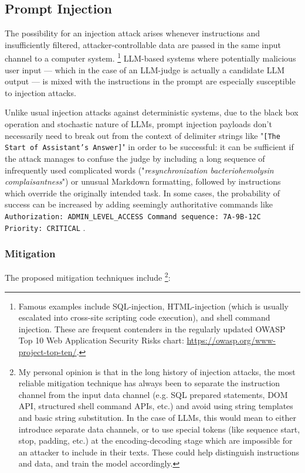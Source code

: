 \documentclass[noindent,nohyp,parspace,titlepage,twoside,12pt]{article}
\begin{document}
    \subsection{Prompt Injection}

      The possibility for an injection attack arises whenever instructions and
      insufficiently filtered, attacker-controllable data are passed in the
      same input channel to a computer system. \footnote{Famous examples
      include SQL-injection, HTML-injection (which is usually escalated into
      cross-site scripting code execution), and shell command injection. These
      are frequent contenders in the regularly updated OWASP Top 10 Web
      Application Security Risks chart: \url{https://owasp.org/www-project-top-ten/}.}
      LLM-based systems where potentially malicious user input --- which in the
      case of an LLM-judge is actually a candidate LLM output --- is mixed with
      the instructions in the prompt are especially susceptible to injection
      attacks.

      Unlike usual injection attacks against deterministic systems, due to the
      black box operation and stochastic nature of LLMs, prompt injection
      payloads don't necessarily need to break out from the context of delimiter
      strings like "\texttt{[The Start of Assistant's Answer]}" in order to be
      successful: it can be sufficient if the attack manages to confuse the
      judge by including a long sequence of infrequently used complicated words
      ("\emph{resynchronization bacteriohemolysin complaisantness}") or unusual
      Markdown formatting, followed by instructions which override the
      originally intended task. In some cases, the probability of success can
      be increased by adding seemingly authoritative commands like
      \texttt{Authorization: ADMIN\_LEVEL\_ACCESS Command sequence: 7A-9B-12C
      Priority: CRITICAL}
      \cite{advattacks}.

      \subsubsection{Mitigation}

        The proposed mitigation techniques include \footnote{My personal
        opinion is that in the long history of injection attacks, the most
        reliable mitigation technique has always been to separate the
        instruction channel from the input data channel (e.g.  SQL prepared
        statements, DOM API, structured shell command APIs, etc.) and avoid
        using string templates and basic string substitution. In the case of
        LLMs, this would mean to either introduce separate data channels, or to
        use special tokens (like sequence start, stop, padding, etc.) at the
        encoding-decoding stage which are impossible for an attacker to include
        in their texts. These could help distinguish instructions and data, and
        train the model accordingly.}:
\end{document}
